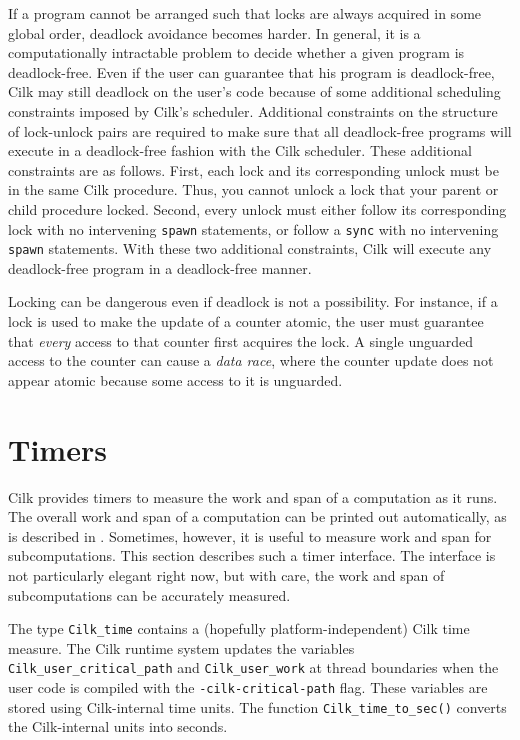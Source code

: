 If a program cannot be arranged such that locks are always acquired in
some global order, deadlock avoidance becomes harder.  In general, it
is a computationally intractable problem to decide whether a given
program is deadlock-free.  Even if the user can guarantee that his
program is deadlock-free, Cilk may still deadlock on the user's code
because of some additional scheduling constraints imposed by Cilk's
scheduler.  Additional constraints on the structure of lock-unlock
pairs are required to make sure that all deadlock-free programs will
execute in a deadlock-free fashion with the Cilk scheduler.  These
additional constraints are as follows.  First, each lock and its
corresponding unlock must be in the same Cilk procedure.  Thus, you
cannot unlock a lock that your parent or child procedure locked.
Second, every unlock must either follow its corresponding lock with no
intervening \texttt{spawn} statements, or follow a \texttt{sync} with
no intervening \texttt{spawn} statements.  With these two additional
constraints, Cilk will execute any deadlock-free program in a
deadlock-free manner.

\indexrace{|(}

Locking can be dangerous even if deadlock is not a possibility.  For
instance, if a lock is used to make the update of a counter atomic,
the user must guarantee that {\em every} access to that counter first
acquires the lock.  A single unguarded access to the counter can cause
a \emph{data race}, where the counter update does not appear atomic
because some access to it is unguarded. 

\section{Timers}
\label{sec:timers}

Cilk provides timers to measure the work and span of a computation as
it runs.  The overall work and span of a computation can be printed
out automatically, as is described in .
Sometimes, however, it is useful to measure work and span for
subcomputations.  This section describes such a timer interface.  The
interface is not particularly elegant right now, but with care, the
work and span of subcomputations can be accurately measured.

 The type
\texttt{Cilk\_time} contains a (hopefully platform-independent) Cilk
time measure.  The Cilk runtime system updates the variables
\texttt{Cilk\_user\_critical\_path} and \texttt{Cilk\_user\_work} at
thread boundaries when the user code is compiled with the
\texttt{-cilk-critical-path} flag.  These variables are stored using
Cilk-internal time units.  The function \texttt{Cilk\_time\_to\_sec()}
converts the Cilk-internal units into seconds.

